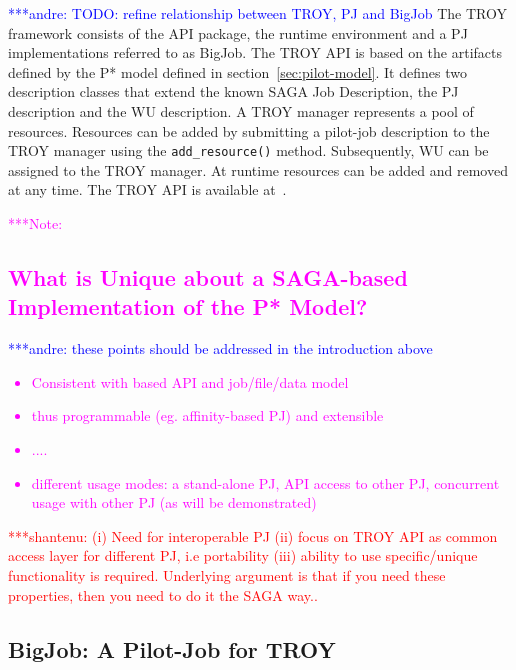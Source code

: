 \documentclass[conference,final]{IEEEtran}
\newcommand{\jhanote}[1]{ {\textcolor{red} { ***shantenu: #1 }}}
\newcommand{\alnote}[1]{ {\textcolor{blue} { ***andre: #1 }}}
\newcommand{\note}[1]{ {\textcolor{magenta} { ***Note: #1 }}}
\newcommand{\alnote}[1]{}
\newcommand{\jhanote}[1]{}
\newcommand{\note}[1]{}
\newcommand{\upp}{\vspace*{-0.5em}}
\begin{document}
\alnote{TODO: refine relationship between TROY, PJ and BigJob}
The TROY framework consists of the API package, the runtime
environment and a PJ implementations referred to as BigJob. 
The TROY API is based on the artifacts defined by the P* model
defined in section~\ref{sec:pilot-model}. It defines two description
classes that extend the known SAGA Job Description, the PJ description
and the WU description. A TROY manager represents a pool of
resources. Resources can be added by submitting a pilot-job
description to the TROY manager using the \texttt{add\_resource()}
method. Subsequently, WU can be assigned to the TROY manager. At
runtime resources can be added and removed at any time.  The TROY API
is available at~\cite{troy_api}.


 


\note{
\subsection{What is Unique about a SAGA-based Implementation of the
  P* Model?}
\alnote{these points should be addressed in the introduction above}
\begin{itemize}
\item Consistent with based API and job/file/data model
\item thus programmable (eg. affinity-based PJ) and extensible 
\item ....
\item different usage modes: a stand-alone PJ, API access to other PJ,
  concurrent usage with other PJ (as will be demonstrated)
\end{itemize}
\jhanote{(i) Need for interoperable PJ (ii) focus on TROY API as
  common access layer for different PJ, i.e portability (iii) ability
  to use specific/unique functionality is required. Underlying
  argument is that if you need these properties, then you need to do
  it the SAGA way..}
}
\subsection{BigJob: A Pilot-Job for TROY\upp\upp}
\end{document}
